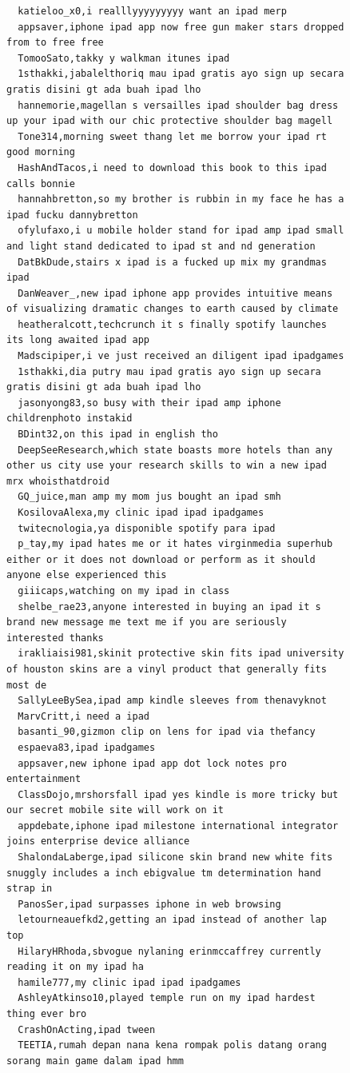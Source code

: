 \begin{figure}[htpb]
\begin{verbatim}
  katieloo_x0,i realllyyyyyyyyy want an ipad merp
  appsaver,iphone ipad app now free gun maker stars dropped from to free free
  TomooSato,takky y walkman itunes ipad
  1sthakki,jabalelthoriq mau ipad gratis ayo sign up secara gratis disini gt ada buah ipad lho
  hannemorie,magellan s versailles ipad shoulder bag dress up your ipad with our chic protective shoulder bag magell
  Tone314,morning sweet thang let me borrow your ipad rt good morning
  HashAndTacos,i need to download this book to this ipad calls bonnie
  hannahbretton,so my brother is rubbin in my face he has a ipad fucku dannybretton
  ofylufaxo,i u mobile holder stand for ipad amp ipad small and light stand dedicated to ipad st and nd generation
  DatBkDude,stairs x ipad is a fucked up mix my grandmas ipad
  DanWeaver_,new ipad iphone app provides intuitive means of visualizing dramatic changes to earth caused by climate
  heatheralcott,techcrunch it s finally spotify launches its long awaited ipad app
  Madscipiper,i ve just received an diligent ipad ipadgames
  1sthakki,dia putry mau ipad gratis ayo sign up secara gratis disini gt ada buah ipad lho
  jasonyong83,so busy with their ipad amp iphone childrenphoto instakid
  BDint32,on this ipad in english tho
  DeepSeeResearch,which state boasts more hotels than any other us city use your research skills to win a new ipad mrx whoisthatdroid
  GQ_juice,man amp my mom jus bought an ipad smh
  KosilovaAlexa,my clinic ipad ipad ipadgames
  twitecnologia,ya disponible spotify para ipad
  p_tay,my ipad hates me or it hates virginmedia superhub either or it does not download or perform as it should anyone else experienced this
  giiicaps,watching on my ipad in class
  shelbe_rae23,anyone interested in buying an ipad it s brand new message me text me if you are seriously interested thanks
  irakliaisi981,skinit protective skin fits ipad university of houston skins are a vinyl product that generally fits most de
  SallyLeeBySea,ipad amp kindle sleeves from thenavyknot
  MarvCritt,i need a ipad
  basanti_90,gizmon clip on lens for ipad via thefancy
  espaeva83,ipad ipadgames
  appsaver,new iphone ipad app dot lock notes pro entertainment
  ClassDojo,mrshorsfall ipad yes kindle is more tricky but our secret mobile site will work on it
  appdebate,iphone ipad milestone international integrator joins enterprise device alliance
  ShalondaLaberge,ipad silicone skin brand new white fits snuggly includes a inch ebigvalue tm determination hand strap in
  PanosSer,ipad surpasses iphone in web browsing
  letourneauefkd2,getting an ipad instead of another lap top
  HilaryHRhoda,sbvogue nylaning erinmccaffrey currently reading it on my ipad ha
  hamile777,my clinic ipad ipad ipadgames
  AshleyAtkinso10,played temple run on my ipad hardest thing ever bro
  CrashOnActing,ipad tween
  TEETIA,rumah depan nana kena rompak polis datang orang sorang main game dalam ipad hmm


\end{verbatim}
\end{figure}
